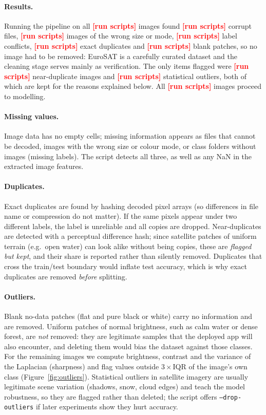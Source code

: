 \documentclass[11pt,a4paper]{article}
\newcommand{\tbd}{\textbf{\textcolor{red}{[run scripts]}}}
\providecommand{\statTotalRaw}{\tbd}
\providecommand{\statCorrupt}{\tbd}
\providecommand{\statBadFormat}{\tbd}
\providecommand{\statConflictLabel}{\tbd}
\providecommand{\statExactDup}{\tbd}
\providecommand{\statDegenerate}{\tbd}
\providecommand{\statNearDupFlagged}{\tbd}
\providecommand{\statOutlierFlagged}{\tbd}
\providecommand{\statTotalClean}{\tbd}
\begin{document}
\paragraph{Results.} Running the pipeline on all \statTotalRaw{} images found \statCorrupt{} corrupt files,
\statBadFormat{} images of the wrong size or mode, \statConflictLabel{} label conflicts, \statExactDup{} exact duplicates
and \statDegenerate{} blank patches, so no image had to be removed: EuroSAT is a carefully curated
dataset and the cleaning stage serves mainly as verification. The only items flagged were
\statNearDupFlagged{} near-duplicate images and \statOutlierFlagged{} statistical outliers, both of which are
kept for the reasons explained below. All \statTotalClean{} images proceed to modelling.

\paragraph{Missing values.} Image data has no empty cells; missing information appears as files that
cannot be decoded, images with the wrong size or colour mode, or class folders without images
(missing labels). The script detects all three, as well as any NaN in the extracted image features.

\paragraph{Duplicates.} Exact duplicates are found by hashing decoded pixel arrays (so differences in
file name or compression do not matter). If the same pixels appear under two different labels, the
label is unreliable and all copies are dropped. Near-duplicates are detected with a perceptual
difference hash; since satellite patches of uniform terrain (e.g.\ open water) can look alike
without being copies, these are \emph{flagged but kept}, and their share is reported rather than
silently removed. Duplicates that cross the train/test boundary would inflate test accuracy, which
is why exact duplicates are removed \emph{before} splitting.

\paragraph{Outliers.} Blank no-data patches (flat and pure black or white) carry no information and are removed. Uniform patches of normal brightness, such as calm water or dense forest, are \emph{not} removed: they are legitimate samples that the deployed app will also encounter, and deleting them would bias the dataset against those classes.
For the remaining images we compute brightness, contrast and the variance of the Laplacian
(sharpness) and flag values outside $3\times$IQR of the image's own class
(Figure~\ref{fig:outliers}). Statistical outliers in satellite imagery are usually legitimate scene
variation (shadows, snow, cloud edges) and teach the model robustness, so they are flagged rather than deleted;
the script offers \texttt{--drop-outliers} if later experiments show they hurt accuracy.
\end{document}
